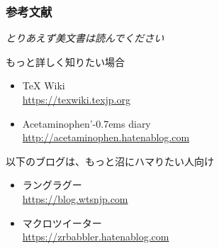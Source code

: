 \begin{frame}
	\frametitle{参考文献}
	\emph{とりあえず美文書は読んでください}
	
	\begin{block}{もっと詳しく知りたい場合}
		\begin{itemize}
			\item {\TeX} Wiki\\\url{https://texwiki.texjp.org}
			\item Acetaminophen'{\kern-0.7em}s diary\\\url{http://acetaminophen.hatenablog.com}
		\end{itemize}
	\end{block}
	
	\bgroup\footnotesize
	\begin{block}{以下のブログは、もっと沼にハマりたい人向け}
		\begin{itemize}
			\item ラングラグー\\\url{https://blog.wtsnjp.com}
			\item マクロツイーター\\\url{https://zrbabbler.hatenablog.com}
		\end{itemize}
	\end{block}
	\egroup
\end{frame}

